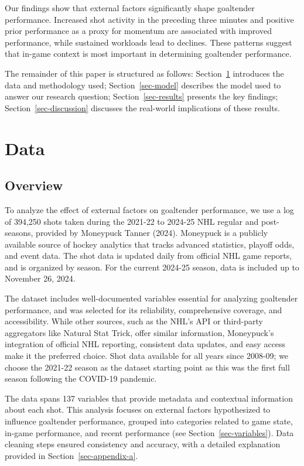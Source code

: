 \documentclass[
  letterpaper,
  DIV=11,
  numbers=noendperiod]{scrartcl}
\begin{document}
Our findings show that external factors significantly shape goaltender
performance. Increased shot activity in the preceding three minutes and
positive prior performance as a proxy for momentum are associated with
improved performance, while sustained workloads lead to declines. These
patterns suggest that in-game context is most important in determining
goaltender performance.

The remainder of this paper is structured as follows:
Section~\ref{sec-data} introduces the data and methodology used;
Section~\ref{sec-model} describes the model used to answer our research
question; Section~\ref{sec-results} presents the key findings;
Section~\ref{sec-discussion} discusses the real-world implications of
these results.

\newpage

\section{Data}\label{sec-data}

\subsection{Overview}\label{overview}

To analyze the effect of external factors on goaltender performance, we
use a log of 394,250 shots taken during the 2021-22 to 2024-25 NHL
regular and post-seasons, provided by Moneypuck Tanner (2024). Moneypuck
is a publicly available source of hockey analytics that tracks advanced
statistics, playoff odds, and event data. The shot data is updated daily
from official NHL game reports, and is organized by season. For the
current 2024-25 season, data is included up to November 26, 2024.

The dataset includes well-documented variables essential for analyzing
goaltender performance, and was selected for its reliability,
comprehensive coverage, and accessibility. While other sources, such as
the NHL's API or third-party aggregators like Natural Stat Trick, offer
similar information, Moneypuck's integration of official NHL reporting,
consistent data updates, and easy access make it the preferred choice.
Shot data available for all years since 2008-09; we choose the 2021-22
season as the dataset starting point as this was the first full season
following the COVID-19 pandemic.

The data spans 137 variables that provide metadata and contextual
information about each shot. This analysis focuses on external factors
hypothesized to influence goaltender performance, grouped into
categories related to game state, in-game performance, and recent
performance (see Section~\ref{sec-variables}). Data cleaning steps
ensured consistency and accuracy, with a detailed explanation provided
in Section~\ref{sec-appendix-a}.
\end{document}
